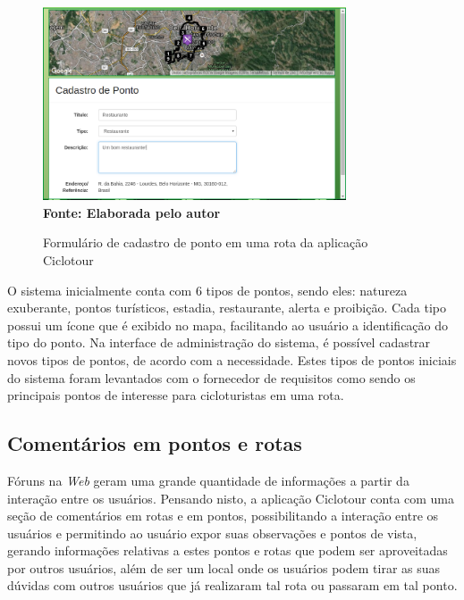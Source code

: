 \begin{figure}[!ht]
	\centering	
	\caption[\hspace{0.1cm} Cadastro de Pontos em Rotas da aplicação Ciclotour.]
	{Formulário de cadastro de ponto em uma rota da aplicação Ciclotour}
	  \vspace{-0.4cm}
	\includegraphics[width=0.8\textwidth]{figuras/cadastroPonto.png}
	 \vspace{0cm}
	\\\textbf{\footnotesize Fonte: Elaborada pelo autor}
	\label{fig:cadastroPonto}
\end{figure}

O sistema inicialmente conta com 6 tipos de pontos, sendo eles: natureza exuberante, pontos turísticos, estadia, restaurante, alerta e proibição. 
Cada tipo possui um ícone que é exibido no mapa, facilitando ao usuário a identificação do tipo do ponto. 
Na interface de administração do sistema, é possível 
cadastrar novos tipos de pontos, de acordo com a necessidade. Estes tipos de pontos iniciais do sistema foram levantados com o fornecedor de 
requisitos como sendo os principais pontos de interesse para cicloturistas em uma rota.

\subsection{Comentários em pontos e rotas}
Fóruns na \textit{Web} geram uma grande quantidade de informações a partir da interação entre os usuários. 
Pensando nisto, a aplicação Ciclotour conta com uma 
seção de comentários em rotas e em pontos, possibilitando a interação entre os usuários e permitindo ao usuário expor suas observações e pontos de 
vista, gerando informações relativas a estes pontos e rotas que podem ser aproveitadas por outros usuários, além de ser um local onde os 
usuários podem tirar as suas dúvidas com outros usuários que já realizaram tal rota ou passaram em tal ponto.

